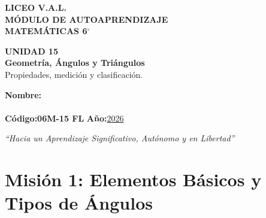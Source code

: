 \documentclass[12pt, letterpaper]{article}
\begin{document}
	
	\begin{center}
		{\Huge\textbf{LICEO V.A.L.}}\\[0.5cm]
		{\LARGE\textbf{MÓDULO DE AUTOAPRENDIZAJE}}\\[0.5cm]
		{\Large\textbf{MATEMÁTICAS 6$^\circ$}}\\[0.5cm]
		\begin{tcolorbox}[colback=valblue!10, colframe=valblue,
			arc=3mm, boxrule=1.5pt]
			\centering
			\Huge\textbf{UNIDAD 15}\\[0.2cm]
			\Large\textbf{Geometría, Ángulos y Triángulos}\\[0.2cm]
			\large Propiedades, medición y clasificación.
		\end{tcolorbox}
		\begin{tcolorbox}[colback=white, colframe=valblue,
			width=12cm, arc=3mm, boxrule=1.5pt]
			\centering%
			\textbf{Nombre:}\\[0.3cm]
			\underline{\hspace{9cm}}\\[0.5cm]
			\textbf{Código:}\;\textbf{06M-15 FL}
			\hspace{1cm}\textbf{Año:}\;\underline{2026}
		\end{tcolorbox}
		\textit{``Hacia un Aprendizaje Significativo, Autónomo y en Libertad''}
	\end{center}
	
	\section*{Misión 1: Elementos Básicos y Tipos de Ángulos}
	
\end{document}
